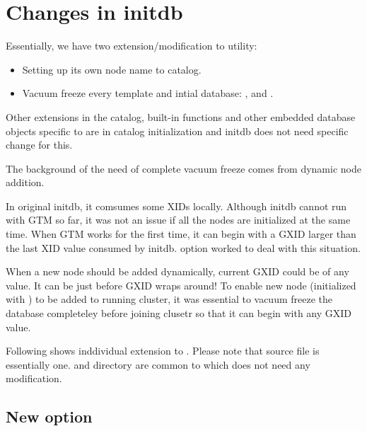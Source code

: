 %
%
%



\section{\label{sec:initdb}Changes in initdb}

  Essentially, we have two extension/modification to  utility:
  
  \begin{itemize}
	  \item Setting up its own node name to  catalog.
	  \item Vacuum freeze every template and intial database: ,  and
			.
  \end{itemize}
  
  Other extensions in the catalog, built-in functions and other embedded database objects specific to
  \XC{} are in catalog initialization and initdb does not need specific change for this.
  
  The background of the need of complete vacuum freeze comes from dynamic node addition.
  
  In original initdb, it comsumes some XIDs locally.
  Although initdb cannot run with GTM so far, it was not an issue if all the nodes are
  initialized at the same time.
  When GTM works for the first time, it can begin with a GXID larger than the last XID
  value consumed by initdb.
   option worked to deal with this situation.
  
  When a new node should be added dynamically, current GXID could be of any value.
  It can be just before GXID wraps around!
  To enable new node (initialized with ) to be added to running cluster,
  it was essential to vacuum freeze the database completeley before joining \XC{} clusetr
  so that it can begin with any GXID value.
  
  Following shows inddividual extension to .
  Please note that  source file is essentially one.
   and  directory are common to \XC{} which does not need any
  modification.



\subsection{New option}

